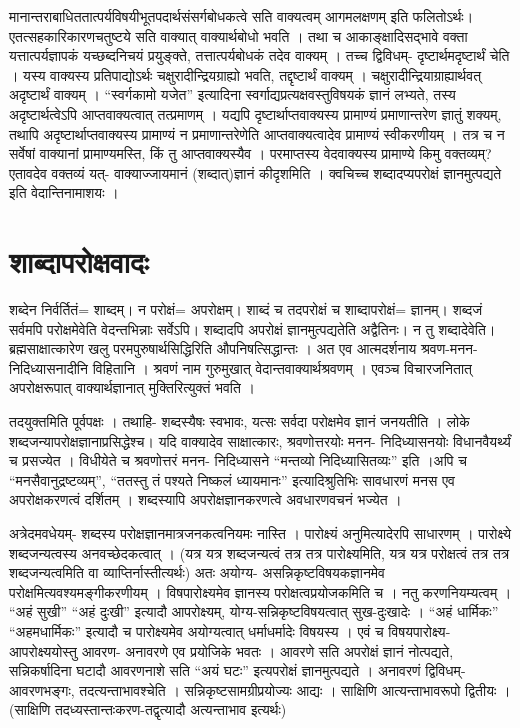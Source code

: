 {मानान्तराबाधिततात्पर्यविषयीभूतपदार्थसंसर्गबोधकत्वे सति वाक्यत्वम् आगमलक्षणम् इति फलितोऽर्थः। एतत्सहकारिकारणचतुष्टये सति वाक्यात् वाक्यार्थबोधो भवति । तथा च आकाङ्क्षादिसद्भावे वक्ता यत्तात्पर्यज्ञापकं यच्छब्दनिचयं प्रयुङ्क्ते, तत्तात्पर्यबोधकं तदेव वाक्यम् । तच्च द्विविधम्- दृष्टार्थमदृष्टार्थं चेति । यस्य वाक्यस्य प्रतिपाद्योऽर्थः चक्षुरादीन्द्रियग्राह्यो भवति, तद्दृष्टार्थं वाक्यम् । चक्षुरादीन्द्रियाग्राह्यार्थवत् अदृष्टार्थं वाक्यम् । “स्वर्गकामो यजेत” इत्यादिना स्वर्गाद्यप्रत्यक्षवस्तुविषयकं ज्ञानं लभ्यते, तस्य अदृष्टार्थत्वेऽपि आप्तवाक्यत्वात् तत्प्रमाणम् । यद्यपि दृष्टार्थाप्तवाक्यस्य प्रामाण्यं प्रमाणान्तरेण ज्ञातुं शक्यम्, तथापि अदृष्टार्थाप्तवाक्यस्य प्रामाण्यं न प्रमाणान्तरेणेति आप्तवाक्यत्वादेव प्रामाण्यं स्वीकरणीयम् । तत्र च न सर्वेषां वाक्यानां प्रामाण्यमस्ति, किं तु आप्तवाक्यस्यैव । परमाप्तस्य वेदवाक्यस्य प्रामाण्ये किमु वक्तव्यम्? एतावदेव वक्तव्यं यत्- वाक्याज्जायमानं (शब्दात्)ज्ञानं कीदृशमिति । क्वचिच्च शब्दादप्यपरोक्षं ज्ञानमुत्पद्यते इति वेदान्तिनामाशयः ।

\section*{शाब्दापरोक्षवादः}

शब्देन निर्वर्तितं= शाब्दम्। न परोक्षं= अपरोक्षम्। शाब्दं च तदपरोक्षं च शाब्दापरोक्षं= ज्ञानम्। शब्दजं सर्वमपि परोक्षमेवेति वेदन्तभिन्नाः सर्वेऽपि। शब्दादपि अपरोक्षं ज्ञानमुत्पद्यतेति अद्वैतिनः। न तु शब्दादेवेति। ब्रह्मसाक्षात्कारेण खलु परमपुरुषार्थसिद्धिरिति औपनिषत्सिद्धान्तः । अत एव आत्मदर्शनाय श्रवण-मनन-निदिध्यासनादीनि विहितानि । श्रवणं नाम गुरुमुखात् वेदान्तवाक्यार्थश्रवणम् । एवञ्च विचारजनितात् अपरोक्षरूपात् वाक्यार्थज्ञानात् मुक्तिरित्युक्तं भवति ।

तदयुक्तमिति पूर्वपक्षः । तथाहि- शब्दस्यैषः स्वभावः, यत्सः सर्वदा परोक्षमेव ज्ञानं जनयतीति । लोके शब्दजन्यापरोक्षज्ञानाप्रसिद्धेश्च। यदि वाक्यादेव साक्षात्कारः, श्रवणोत्तरयोः मनन- निदिध्यासनयोः विधानवैयर्थ्यं च प्रसज्येत । विधीयेते च श्रवणोत्तरं मनन- निदिध्यासने “मन्तव्यो निदिध्यासितव्यः” इति ।अपि च “मनसैवानुद्रष्टव्यम्”, “ततस्तु तं पश्यते निष्कलं ध्यायमानः” इत्यादिश्रुतिभिः सावधारणं मनस एव अपरोक्षकरणत्वं दर्शितम् । शब्दस्यापि अपरोक्षज्ञानकरणत्वे अवधारणवचनं भज्येत ।

अत्रेदमवधेयम्- शब्दस्य परोक्षज्ञानमात्रजनकत्वनियमः नास्ति । पारोक्ष्यं अनुमित्यादेरपि साधारणम् । पारोक्ष्ये शब्दजन्यत्वस्य अनवच्छेदकत्वात् । (यत्र यत्र शब्दजन्यत्वं तत्र तत्र पारोक्ष्यमिति, यत्र यत्र परोक्षत्वं तत्र तत्र शब्दजन्यत्वमिति वा व्याप्तिर्नास्तीत्यर्थः) अतः अयोग्य- असन्निकृष्टविषयकज्ञानमेव परोक्षमित्यवश्यमङ्गीकरणीयम् । विषपारोक्ष्यमेव ज्ञानस्य परोक्षत्वप्रयोजकमिति च । नतु करणनियम्यत्वम् । “अहं सुखी” “अहं दुःखी” इत्यादौ आपरोक्ष्यम्, योग्य-सन्निकृष्टविषयत्वात् सुख-दुःखादेः । “अहं धार्मिकः” “अहमधार्मिकः” इत्यादौ च पारोक्ष्यमेव अयोग्यत्वात् धर्माधर्मादेः विषयस्य । एवं च विषयपारोक्ष्य- आपरोक्ष्ययोस्तु आवरण- अनावरणे एव प्रयोजिके भवतः । आवरणे सति अपरोक्षं ज्ञानं नोत्पद्यते, सन्निकर्षादिना घटादौ आवरणनाशे सति “अयं घटः” इत्यपरोक्षं ज्ञानमुत्पद्यते । अनावरणं द्विविधम्- आवरणभङ्गः, तदत्यन्ताभावश्चेति । सन्निकृष्टसामग्रीप्रयोज्यः आद्यः । साक्षिणि आत्यन्ताभावरूपो द्वितीयः ।(साक्षिणि तदध्यस्तान्तःकरण-तद्वृत्यादौ अत्यन्ताभाव इत्यर्थः)

}
